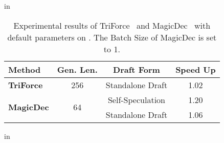 \begin{table}[ht]
    \centering
    \small
    \caption{Experimental results of TriForce~\citep{triforce} and MagicDec~\citep{magicdec} with default parameters on \llama. The Batch Size of MagicDec is set to 1.\label{tab:short}}
     in
    \begin{tabular}{l|ccc}
    \toprule
    \textbf{Method} & \textbf{Gen. Len.} & \textbf{Draft Form} & \textbf{Speed Up} \\ \midrule
    \textbf{TriForce} & 256 & Standalone Draft & 1.02 \\ \midrule
    \multirow{2}{*}{\textbf{MagicDec}} & \multirow{2}{*}{64} & Self-Speculation & 1.20 \\
     &  & Standalone Draft & 1.06 \\
     \bottomrule
    \end{tabular}
 in
\end{table}
